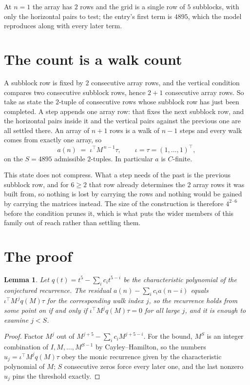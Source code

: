 \documentclass[11pt,a4paper]{article}
\theoremstyle{plain}
\newtheorem{lemma}[theorem]{Lemma}
\theoremstyle{definition}
\begin{document}
At $n=1$ the array has $2$ rows and the grid is a single row of $5$
subblocks, with only the horizontal pairs to test; the entry's first term is
$4895$, which the model reproduces along with every later term.

\section{The count is a walk count}

A subblock row is fixed by $2$ consecutive array rows, and the vertical condition compares
two consecutive subblock rows, hence $2+1$ consecutive array rows. So take as state the
$2$-tuple of consecutive rows whose subblock row has just been completed. A step appends one
array row: that fixes the next subblock row, and the horizontal pairs inside it and the
vertical pairs against the previous one are all settled there. An array of $n+1$ rows is
a walk of $n-1$ steps and every walk comes from exactly one array, so
\[
a(n)\;=\;\iota^{\!\top}M^{\,n-1}\tau,\qquad\iota=\tau=(1,\dots,1)^{\!\top},
\]
on the $S=4895$ admissible $2$-tuples. In particular $a$ is $C$-finite.

This state does not compress. What a step needs of the past is the previous subblock row, and
for $6\ge2$ that row already determines the $2$ array rows it was built from, so nothing
is lost by carrying the rows and nothing would be gained by carrying the matrices instead. The
size of the construction is therefore $4^{2\cdot6}$ before the condition prunes
it, which is what puts the wider members of this family out of reach rather than settling them.

\section{The proof}

\begin{lemma}\label{lem:crit}
Let $q(t)=t^{5}-\sum_i c_it^{5-i}$ be the characteristic polynomial of the
conjectured recurrence. The residual $a(n)-\sum_ic_ia(n-i)$ equals
$\iota^{\!\top}M^{\,j}q(M)\tau$ for the corresponding walk index $j$, so the recurrence
holds from some point on if and only if $\iota^{\!\top}M^{j}q(M)\tau=0$ for all large $j$,
and it is enough to examine $j<S$.
\end{lemma}

\begin{proof}
Factor $M^{j}$ out of $M^{j+5}-\sum_ic_iM^{j+5-i}$. For the bound, $M^{S}$
is an integer combination of $I,M,\dots,M^{S-1}$ by Cayley--Hamilton, so the numbers
$u_j=\iota^{\!\top}M^{j}q(M)\tau$ obey the monic recurrence given by the characteristic
polynomial of $M$; $S$ consecutive zeros force every later one, and the last nonzero $u_j$
pins the threshold exactly.
\end{proof}
\end{document}
